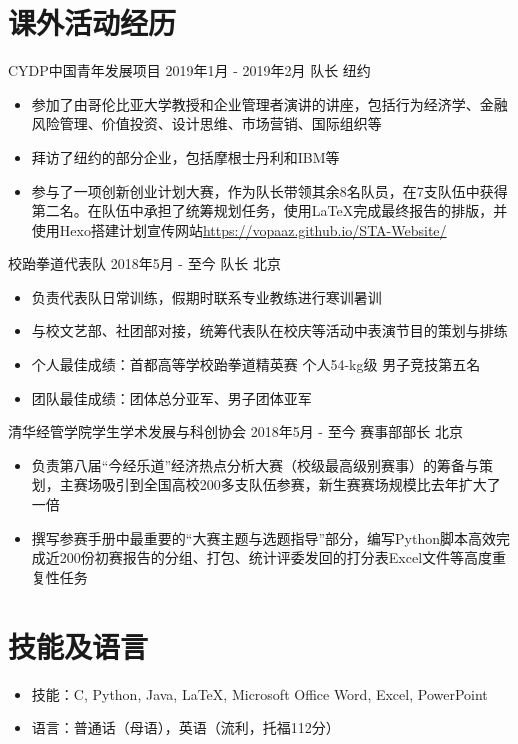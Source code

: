 \documentclass{resumeZH}
\begin{document}
    \section{课外活动经历}
    \Experience
    {CYDP中国青年发展项目}
    {2019年1月 - 2019年2月}
    {队长}
    {纽约}
    \begin{itemize}
        \item 参加了由哥伦比亚大学教授和企业管理者演讲的讲座，包括行为经济学、金融风险管理、价值投资、设计思维、市场营销、国际组织等
        \item 拜访了纽约的部分企业，包括摩根士丹利和IBM等
        \item 参与了一项创新创业计划大赛，作为队长带领其余8名队员，在7支队伍中获得第二名。在队伍中承担了统筹规划任务，使用\LaTeX 完成最终报告的排版，并使用Hexo搭建计划宣传网站\href{https://vopaaz.github.io/STA-Website/}{https://vopaaz.github.io/STA-Website/}
    \end{itemize}

    \Experience
    {校跆拳道代表队}
    {2018年5月 - 至今}
    {队长}
    {北京}

    \begin{itemize}
        \item 负责代表队日常训练，假期时联系专业教练进行寒训暑训
        \item 与校文艺部、社团部对接，统筹代表队在校庆等活动中表演节目的策划与排练
        \item 个人最佳成绩：首都高等学校跆拳道精英赛 个人54-kg级 男子竞技第五名
        \item 团队最佳成绩：团体总分亚军、男子团体亚军
    \end{itemize}

    \Experience
    {清华经管学院学生学术发展与科创协会}
    {2018年5月 - 至今}
    {赛事部部长}
    {北京}

    \begin{itemize}
        \item 负责第八届“今经乐道”经济热点分析大赛（校级最高级别赛事）的筹备与策划，主赛场吸引到全国高校200多支队伍参赛，新生赛赛场规模比去年扩大了一倍
        \item 撰写参赛手册中最重要的“大赛主题与选题指导”部分，编写Python脚本高效完成近200份初赛报告的分组、打包、统计评委发回的打分表Excel文件等高度重复性任务
    \end{itemize}

    \section{技能及语言}
    \vspace{0.618ex}
    \begin{itemize}
        \item 技能：C, Python, Java, {\LaTeX}, Microsoft Office Word, Excel, PowerPoint
        \item 语言：普通话（母语），英语（流利，托福112分）
    \end{itemize}
\end{document}
